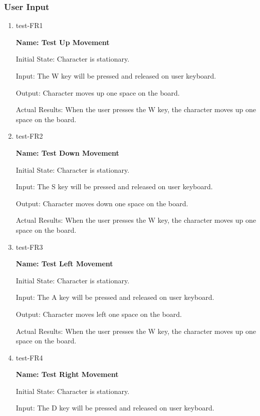 \documentclass[12pt, titlepage]{article}
\begin{document}
\subsubsection{User Input }
\begin{enumerate}

\item{test-FR1\\}

\textbf{Name: Test Up Movement}

Initial State: Character is stationary.
					
Input: The W key will be pressed and released on user keyboard.
					
Output: Character moves up one space on the board.

Actual Results: When the user presses the W key, the character moves up one space on the board.

\item{test-FR2\\}

\textbf{Name: Test Down Movement}

Initial State: Character is stationary.
					
Input: The S key will be pressed and released on user keyboard.
					
Output: Character moves down one space on the board.

Actual Results: When the user presses the W key, the character moves up one space on the board.

\item{test-FR3\\}

\textbf{Name: Test Left Movement}

Initial State: Character is stationary.
					
Input: The A key will be pressed and released on user keyboard.
					
Output: Character moves left one space on the board.

Actual Results: When the user presses the W key, the character moves up one space on the board.

\item{test-FR4\\}

\textbf{Name: Test Right Movement}

Initial State: Character is stationary.
					
Input: The D key will be pressed and released on user keyboard.
					

\end{enumerate}
\end{document}
